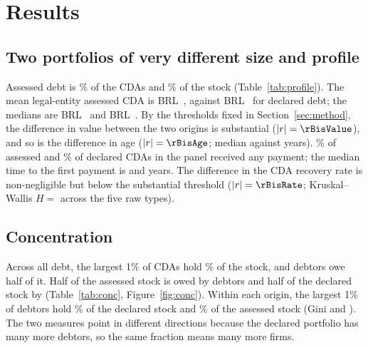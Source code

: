 \section{Results}\label{sec:results}

\subsection{Two portfolios of very different size and profile}\label{sec:res-profile}
Assessed debt is \pctCdaAssessed\% of the \vat{} CDAs and \pctStockAssessed\% of the stock (Table~\ref{tab:profile}).
The mean legal-entity assessed CDA is BRL~\meanValueAssessed, against BRL~\meanValueDeclared{} for declared debt; the medians are BRL~\medianValueAssessed{} and BRL~\medianValueDeclared.
By the thresholds fixed in Section~\ref{sec:method}, the difference in value between the two origins is substantial ($|r|=\rBisValue$), and so is the difference in age ($|r|=\rBisAge$; median \medianAgeAssessed{} against \medianAgeDeclared{} years).
\pctAnyPaymentAssessed\% of assessed and \pctAnyPaymentDeclared\% of declared CDAs in the panel received any payment; the median time to the first payment is \yearsFirstPaymentAssessed{} and \yearsFirstPaymentDeclared{} years.
The difference in the CDA recovery rate is non-negligible but below the substantial threshold ($|r|=\rBisRate$; Kruskal--Wallis $H={}$\kwRateH{} across the five raw types).

\begin{table}[H]\centering\small
\caption{Profile of the two origins. Value, age and filing: December 2025 snapshot, legal entities; payment: 2016--2025 panel.}\label{tab:profile}

\end{table}

\subsection{Concentration}\label{sec:res-conc}
Across all \vat{} debt, the largest 1\% of CDAs hold \topOneCdaVat\% of the stock, and \kFiftyDebtorVat{} debtors owe half of it.
Half of the assessed stock is owed by \kFiftyDebtorAssessed{} debtors and half of the declared stock by \kFiftyDebtorDeclared{} (Table~\ref{tab:conc}, Figure~\ref{fig:conc}).
Within each origin, the largest 1\% of debtors hold \topOneDebtorDeclared\% of the declared stock and \topOneDebtorAssessed\% of the assessed stock (Gini \giniDebtorDeclared{} and \giniDebtorAssessed).
The two measures point in different directions because the declared portfolio has many more debtors, so the same fraction means many more firms.

